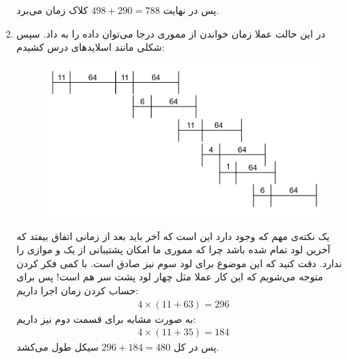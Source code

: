 \begin{enumerate}
    پس در نهایت
    $498 + 290 = 788$
    کلاک زمان می‌برد.
    \item در این حالت عملا زمان خواندن از مموری درجا می‌توان داده را به  داد.
    سپس شکلی مانند اسلاید‌های درس کشیدم:
    \begin{figure}[H]
        \centering
        \includegraphics[scale=0.45]{pics/3-c.png}
    \end{figure}
    یک نکته‌ی مهم که وجود دارد این است که
    آخر باید بعد از زمانی اتفاق بیفتد که آخرین لود تمام شده باشد چرا که مموری ما امکان پشتیبانی از یک
     و 
    موازی را ندارد. دقت کنید که این موضوع برای لود سوم نیز صادق است.
    با کمی فکر کردن متوجه می‌شویم که این کار عملا مثل چهار لود پشت سر هم است!
    پس برای حساب کردن زمان اجرا داریم:
    \begin{gather*}
        4 \times (11 + 63) = 296
    \end{gather*}
    به صورت مشابه برای قسمت دوم نیز داریم:
    \begin{gather*}
        4 \times (11 + 35) = 184
    \end{gather*}
    پس در کل
    $296 + 184 = 480$
    سیکل طول می‌کشد.
\end{enumerate}